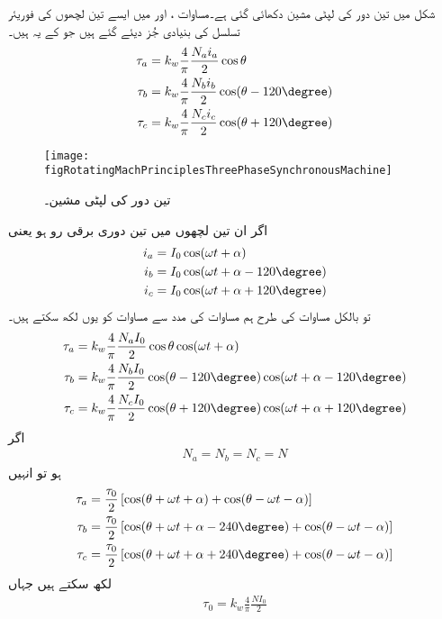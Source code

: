 شکل   میں تین دور کی لپٹی مشین دکھائی گئی ہے۔مساوات ،  اور  میں ایسے تین لچھوں کی فوریئر تسلسل کی بنیادی جُز دیئے گئے ہیں جو کے یہ ہیں۔
\begin{align}
\tau_a&=k_w \frac{4}{\pi}\frac{N_a i_a}{2}\cos \theta\\
\tau_b&=k_w \frac{4}{\pi}\frac{N_b i_b}{2}\cos (\theta-120\degree)\\
\tau_c&=k_w \frac{4}{\pi}\frac{N_c i_c}{2}\cos (\theta+120\degree)
\end{align}
%
\begin{figure}
\centering
\texttt{[image: figRotatingMachPrinciplesThreePhaseSynchronousMachine]}
\caption{تین دور کی لپٹی مشین۔}
\label{شکل_گھومتے_مشین_تین_دور_کے_لئے_لپٹی}
\end{figure}
اگر ان تین لچھوں میں تین دوری برقی رو ہو یعنی
\begin{align}
i_a&=I_0 \cos (\omega t+\alpha)\\
i_b&=I_0 \cos (\omega t +\alpha -120\degree)\\
i_c&=I_0 \cos (\omega t +\alpha +120\degree)
\end{align}
تو بالکل مساوات کی طرح ہم مساوات  کی مدد سے مساوات کو یوں لکھ سکتے ہیں۔
\begin{align}
\tau_a&=k_w \frac{4}{\pi}\frac{N_a I_0}{2} \cos \theta \cos (\omega t +\alpha)\\
\tau_b&=k_w \frac{4}{\pi}\frac{N_b I_0}{2} \cos (\theta -120\degree)\cos (\omega t +\alpha -120\degree)\\
\tau_c&=k_w \frac{4}{\pi}\frac{N_c I_0}{2} \cos (\theta +120\degree)\cos (\omega t +\alpha +120\degree)
\end{align}
اگر
\begin{align*}
N_a=N_b=N_c=N
\end{align*}
ہو تو انہیں
\begin{align}\label{مساوات_تبادلہ_تین_گھومتے_دباو}
\tau_a&=\frac{\tau_0}{2} \left[\cos (\theta +\omega t +\alpha) +\cos (\theta -\omega t -\alpha) \right]\\
\tau_b&=\frac{\tau_0}{2} \left[\cos (\theta +\omega t +\alpha-240\degree) +\cos (\theta -\omega t -\alpha) \right]\\
\tau_c&=\frac{\tau_0}{2} \left[\cos (\theta +\omega t +\alpha+240\degree) +\cos (\theta -\omega t -\alpha) \right]
\end{align}
لکھ سکتے ہیں جہاں
\begin{align}
\tau_0=k_w \frac{4}{\pi}\frac{N I_0}{2}
\end{align}
